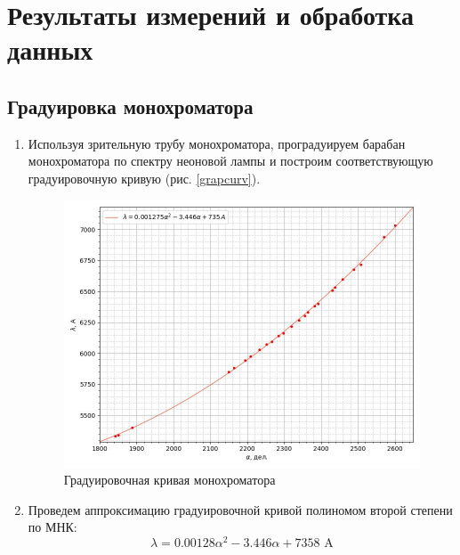 \documentclass[a4paper,12pt]{article}
\begin{document}
\section{Результаты измерений и обработка данных}

\subsection{Градуировка монохроматора}
\begin{enumerate}


\item Используя зрительную трубу монохроматора, проградуируем барабан монохроматора по спектру неоновой лампы и построим соответствующую градуировочную кривую (рис. \eqref{grapcurv}).
\begin{figure}[h!]
    \centering
 
    \includegraphics[scale = 0.5]{photo_2023-09-10 3.28.19 PM.jpeg}
    \caption{Градуировочная кривая монохроматора}
    \label{grapcurv}
\end{figure}


\item Проведем аппроксимацию градуировочной кривой полиномом второй степени по МНК:
\begin{equation*}
    \lambda = 0.00128 \alpha^2 - 3.446 \alpha + 7358 \text{ A}
\end{equation*}


\end{enumerate}
\end{document}
